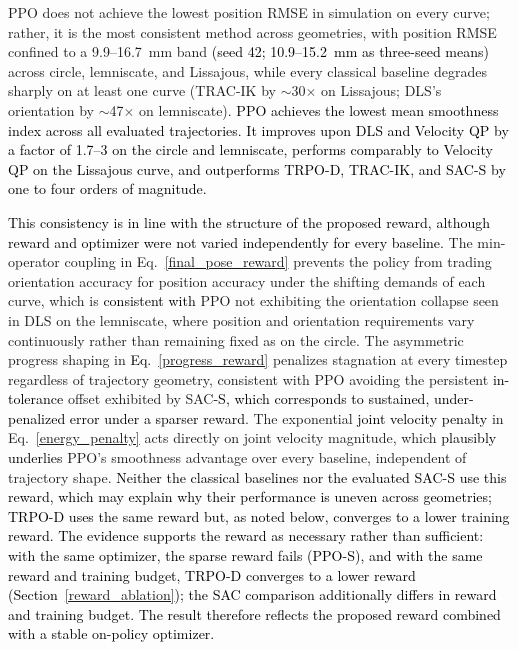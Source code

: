 \documentclass[preprint,12pt]{elsarticle}
\begin{document}
PPO does not achieve the lowest position RMSE in simulation on every
curve; rather, it is the most consistent method across geometries, with
position RMSE confined to a 9.9--16.7~mm band \textcolor{black}{(seed 42; 10.9--15.2~mm as three-seed means)} across circle, lemniscate,
and Lissajous, while every classical baseline degrades sharply on at
least one curve (TRAC-IK by $\sim$30$\times$ on Lissajous; DLS's
orientation by $\sim$47$\times$ on lemniscate). \textcolor{black}{PPO achieves the lowest mean smoothness index across all evaluated trajectories. It improves upon DLS and Velocity QP by a factor of 1.7--3 on the circle and lemniscate, performs comparably to Velocity QP on the Lissajous curve, and outperforms TRPO-D, TRAC-IK, and SAC-S by one to four orders of magnitude.}

\textcolor{black}{This consistency is in line with the structure of the proposed reward, although reward and optimizer were not varied independently for every baseline.} The min-operator coupling in Eq.~\eqref{final_pose_reward} prevents the policy from trading orientation accuracy for position accuracy under the shifting demands of each curve, which is \textcolor{black}{consistent with} PPO not exhibiting the orientation collapse seen in DLS on the lemniscate, where position and orientation
requirements vary continuously rather than remaining fixed as on the
circle. The asymmetric progress shaping in \textcolor{black}{Eq.~\eqref{progress_reward}} penalizes stagnation at every timestep regardless of trajectory geometry, consistent with PPO avoiding the persistent \textcolor{black}{in-tolerance} offset exhibited by SAC\textcolor{black}{-S, which corresponds to sustained, under-penalized error under a sparser reward}. The exponential \textcolor{black}{joint velocity penalty} in Eq.~\eqref{energy_penalty} acts directly on joint velocity magnitude, which \textcolor{black}{plausibly underlies} PPO's smoothness advantage over every baseline, independent of trajectory shape. \textcolor{black}{Neither the classical baselines nor the evaluated SAC-S use this reward, which may explain why their performance is uneven across geometries; TRPO-D uses the same reward but, as noted below, converges to a lower training reward.} \textcolor{black}{The evidence supports the reward as necessary rather than sufficient: with the same optimizer, the sparse reward fails (PPO-S), and with the same reward and training budget, TRPO-D converges to a lower reward (Section~\ref{reward_ablation}); the SAC comparison additionally differs in reward and training budget. The result therefore reflects the proposed reward combined with a stable on-policy optimizer.}
\end{document}
